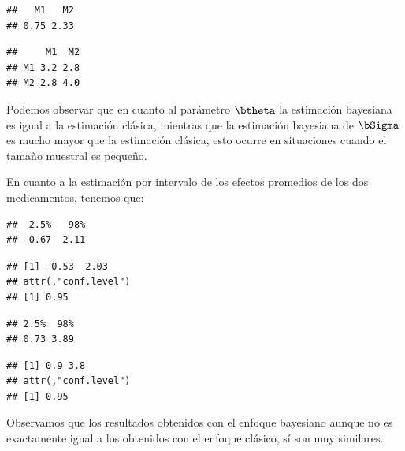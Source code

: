 \begin{Eje}
\begin{knitrout}
\begin{kframe}
\begin{verbatim}
##   M1   M2 
## 0.75 2.33
\end{verbatim}
\begin{alltt}
\end{alltt}
\begin{verbatim}
##     M1  M2
## M1 3.2 2.8
## M2 2.8 4.0
\end{verbatim}
\end{kframe}
\end{knitrout}
Podemos observar que en cuanto al parámetro $\btheta$ la estimación bayesiana es igual a la estimación clásica, mientras que la estimación bayesiana de $\bSigma$ es mucho mayor que la estimación clásica, esto ocurre en situaciones cuando el tamaño muestral es pequeño.

En cuanto a la estimación por intervalo de los efectos promedios de los dos medicamentos, tenemos que:
\begin{knitrout}
\color{fgcolor}\begin{kframe}
\begin{alltt}
\hlstd{(theta.pos[,}\hlstd{],} \hlstd{(}\hlstd{,}\hlstd{))}
\end{alltt}
\begin{verbatim}
##  2.5%   98% 
## -0.67  2.11
\end{verbatim}
\begin{alltt}
\hlstd{(y[,}\hlstd{])}\hlopt{$}
\end{alltt}
\begin{verbatim}
## [1] -0.53  2.03
## attr(,"conf.level")
## [1] 0.95
\end{verbatim}
\begin{alltt}
\hlstd{(theta.pos[,}\hlstd{],} \hlstd{(}\hlstd{,}\hlstd{))}
\end{alltt}
\begin{verbatim}
## 2.5%  98% 
## 0.73 3.89
\end{verbatim}
\begin{alltt}
\hlstd{(y[,}\hlstd{])}\hlopt{$}
\end{alltt}
\begin{verbatim}
## [1] 0.9 3.8
## attr(,"conf.level")
## [1] 0.95
\end{verbatim}
\end{kframe}
\end{knitrout}
Observamos que los resultados obtenidos con el enfoque bayesiano aunque no es exactamente igual a los obtenidos con el enfoque clásico, sí son muy similares.


\end{Eje}
